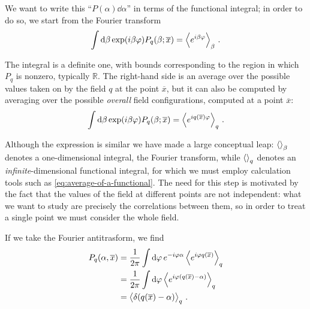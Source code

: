 \documentclass[main.tex]{subfiles}
\begin{document}
We want to write this ``\(P(\alpha ) \dd{\alpha }\)'' in terms of the functional integral; in order to do so, we start from the Fourier transform 
%
\begin{align}
\int \dd{\beta } \exp(i \beta \varphi ) P_q (\beta ; \overline{x}) = \expval{e^{i \beta \varphi }}_{\beta }
\,.
\end{align}

The integral is a definite one, with bounds corresponding to the region in which \(P_q\) is nonzero, typically \(\mathbb{R}\).
The right-hand side is an average over the possible values taken on by the field \(q\) at the point \(\overline{x}\), but it can also be computed by averaging over the possible \emph{overall} field configurations, computed at a point \(\overline{x}\):
%
\begin{align}
\int \dd{\beta } \exp(i \beta \varphi ) P_q (\beta ; \overline{x}) = \expval{e^{i q(\overline{x}) \varphi }}_{q }
\,.
\end{align}

Although the expression is similar we have made a large conceptual leap: \(\expval{}_\beta \) denotes a one-dimensional integral, the Fourier transform, while \(\expval{}_q\) denotes an \emph{infinite}-dimensional functional integral, for which we must employ calculation tools such as \eqref{eq:average-of-a-functional}. 
The need for this step is motivated by the fact that the values of the field at different points are not independent: what we want to study are precisely the correlations between them, so in order to treat a single point we must consider the whole field.


If we take the Fourier antitrasform, we find 
%
\begin{align}
P_q (\alpha , \overline{x}) &= \frac{1}{2 \pi } \int \dd{\varphi } e^{-i \varphi \alpha } \expval{e^{i \varphi q (\overline{x})}}_q  \\
&= \frac{1}{2 \pi } \int \dd{\varphi } \expval{e^{i \varphi (q(\overline{x}) - \alpha )}}_q  \\
&= \expval{ \delta (q(\overline{x}) - \alpha ) }_q
\,.
\end{align}
\end{document}

